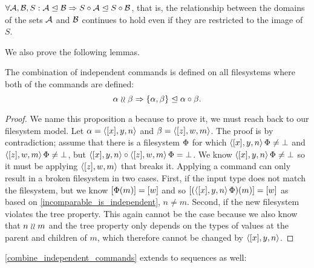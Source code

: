 \begin{myclm}
$\forall \mathcal{A},\mathcal{B},S: {\mathcal{A}}\trianglelefteq{\mathcal{B}} \Rightarrow {S\mathbin{\circ}\mathcal{A}}\trianglelefteq{S\mathbin{\circ}\mathcal{B}}$, that is,
the relationship between the domains of the sets $\mathcal{A}$ and $\mathcal{B}$ continues to hold
even if they are restricted to the image of $S$.
\end{myclm}

We also prove the following lemmas.

\begin{myax}
The combination of independent commands is defined on all filesystems
where both of the commands are defined:
\[ \alpha\mathrel{\wr\wr} \beta \Rightarrow {\{{\alpha, \beta}\}}\trianglelefteq{\alpha\mathbin{\circ}\beta}. \]
\end{myax}
\begin{proof}
We name this proposition a  
because to prove it, we must reach back to our filesystem model.
Let $\alpha=\langle{[x],y,n}\rangle$ and $\beta=\langle{[z],w,m}\rangle$.
The proof is by contradiction;
assume that there is a filesystem $\Phi$ for which
$\langle{[x],y,n}\rangle\,\Phi\neq\bot$ and $\langle{[z],w,m}\rangle\,\Phi\neq\bot$, but
$\langle{[x],y,n}\rangle\mathbin{\circ} \langle{[z],w,m}\rangle\,\Phi=\bot$.
We know $\langle{[x],y,n}\rangle\,\Phi\neq\bot$ so it must be applying 
$\langle{[z],w,m}\rangle$ that breaks it.
Applying a command can only result in a broken filesystem in two cases.
First, if the input type does not match the filesystem,
but we know $[\Phi(m)]=[w]$ and so
$[(\langle{[x],y,n}\rangle\,\Phi)(m)]=[w]$ as based on \cref{incomparable_is_independent}, $n\neq m$.
Second, if the new filesystem violates the tree property.
This again cannot be the case because we also know that $n\mathrel{\wr\wr} m$
and the tree property only depends on the types of values at the parent and children of $m$,
which therefore cannot be changed by $\langle{[x],y,n}\rangle$.
\end{proof}

\cref{combine_independent_commands} extends to sequences as well:

